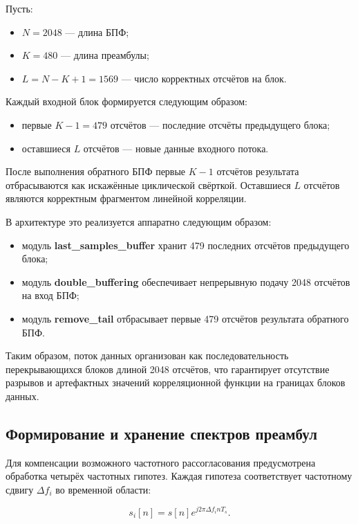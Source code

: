 Пусть:
\begin{itemize}
	\item $N = 2048$ --- длина БПФ;
	\item $K = 480$ --- длина преамбулы;
	\item $L = N - K + 1 = 1569$ --- число корректных отсчётов на блок.
\end{itemize}

Каждый входной блок формируется следующим образом:
\begin{itemize}
	\item первые $K-1 = 479$ отсчётов --- последние отсчёты предыдущего блока;
	\item оставшиеся $L$ отсчётов --- новые данные входного потока.
\end{itemize}

После выполнения обратного БПФ первые $K-1$ отсчётов результата отбрасываются как искажённые циклической свёрткой. Оставшиеся $L$ отсчётов являются корректным фрагментом линейной корреляции.

В архитектуре это реализуется аппаратно следующим образом:

\begin{itemize}
	\item модуль \textbf{last\_samples\_buffer} хранит 479 последних отсчётов предыдущего блока;
	\item модуль \textbf{double\_buffering} обеспечивает непрерывную подачу 2048 отсчётов на вход БПФ;
	\item модуль \textbf{remove\_tail} отбрасывает первые 479 отсчётов результата обратного БПФ.
\end{itemize}

Таким образом, поток данных организован как последовательность перекрывающихся блоков длиной 2048 отсчётов, что гарантирует отсутствие разрывов и артефактных значений корреляционной функции на границах блоков данных.

\subsection{Формирование и хранение спектров преамбул}

Для компенсации возможного частотного рассогласования предусмотрена обработка четырёх частотных гипотез. Каждая гипотеза соответствует частотному сдвигу $\Delta f_i$ во временной области:

\begin{equation}
	s_i[n] = s[n] e^{j2\pi \Delta f_i n T_s}.
\end{equation}

